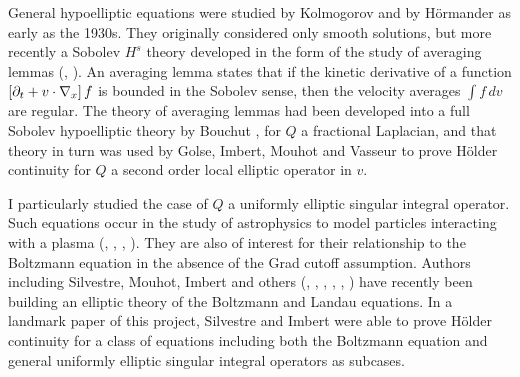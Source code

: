 General hypoelliptic equations were studied by Kolmogorov and by H\"{o}rmander \cite{Ho} as early as the 1930s.  They originally considered only smooth solutions, but more recently a Sobolev $H^s$ theory developed in the form of the study of averaging lemmas (\cite{Ag}, \cite{GoLiPeSe}).  An averaging lemma states that if the kinetic derivative of a function $\left[ \partial_t + v\cdot\nabla_x \right] f$ is bounded in the Sobolev sense, then the velocity averages $\int f \,dv$ are regular.  The theory of averaging lemmas had been developed into a full Sobolev hypoelliptic theory by Bouchut \cite{Bo}, for $Q$ a fractional Laplacian, and that theory in turn was used by Golse, Imbert, Mouhot and Vasseur \cite{GoImMoVa} to prove H\"{o}lder continuity for $Q$ a second order local elliptic operator in $v$.  

I particularly studied the case of $Q$ a uniformly elliptic singular integral operator.  Such equations occur in the study of astrophysics to model particles interacting with a plasma (\cite{Ka}, \cite{Go.physics}, \cite{LaKe}, \cite{MeRo}).  They are also of interest for their relationship to the Boltzmann equation in the absence of the Grad cutoff assumption.  Authors including Silvestre, Mouhot, Imbert and others (\cite{ImSi}, \cite{ImMoSi}, \cite{Mo}, \cite{Si}, \cite{HeSnTa}, \cite{HeSn}) have recently been building an elliptic theory of the Boltzmann and Landau equations.  In a landmark paper of this project, Silvestre and Imbert were able to prove H\"{o}lder continuity for a class of equations including both the Boltzmann equation and general uniformly elliptic singular integral operators as subcases.  

